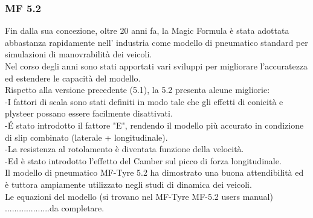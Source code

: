 \subsubsection{MF 5.2}
Fin dalla sua concezione, oltre 20 anni fa, la Magic Formula è stata adottata abbastanza rapidamente nell' industria come modello di pneumatico standard per simulazioni di manovrabilità dei veicoli.\\ 
Nel corso degli anni sono stati apportati vari sviluppi per
migliorare l'accuratezza ed estendere le capacità del modello.\\
Rispetto alla versione precedente (5.1), la 5.2 presenta alcune migliorie:\\
-I fattori di scala sono stati definiti in modo tale che gli effetti di conicità e plysteer possano essere facilmente disattivati.\\
-\'E stato introdotto il fattore "E", rendendo il modello più accurato in condizione di slip combinato (laterale + longitudinale).\\
-La resistenza al rotolamento è diventata funzione della velocità.\\
-Ed è stato introdotto l'effetto del Camber sul picco di forza longitudinale.\\

Il modello di pneumatico MF-Tyre 5.2 ha dimostrato una buona attendibilità ed è tuttora ampiamente utilizzato negli studi di dinamica dei veicoli. \\



Le equazioni del modello (si trovano nel MF-Tyre MF-5.2 users manual) \\
...................da completare.

